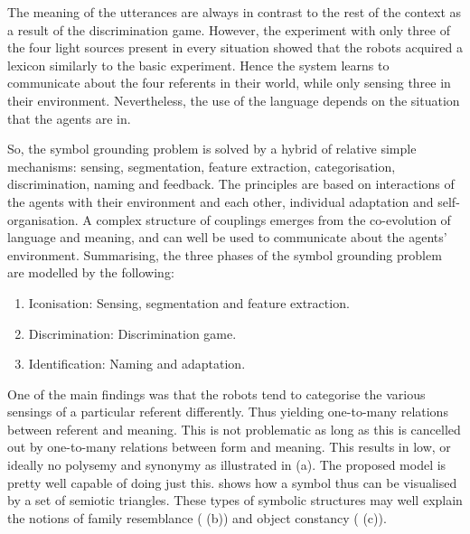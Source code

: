 The meaning of the utterances are always in contrast to the rest of the context as a result of the discrimination game. However, the experiment with only three of the four light sources present in every situation showed that the robots acquired a lexicon similarly to the basic experiment. Hence the system learns to communicate about the four referents in their world, while only sensing three in their environment. Nevertheless, the use of the language depends on the situation that the agents are in.

So, the symbol grounding problem is solved by a hybrid of relative simple mechanisms: sensing, segmentation, feature extraction, categorisation, discrimination, naming and feedback. The principles are based on interactions of the agents with their environment and each other, individual adaptation and self-organisation. A complex structure of couplings emerges from the co-evolution of language and meaning, and can well be used to communicate about the agents' environment. Summarising, the three phases of the symbol grounding problem are modelled by the following:

\begin{enumerate}
\item {\sc Iconisation:} Sensing, segmentation and feature extraction.
\item {\sc Discrimination:} Discrimination game.
\item {\sc Identification:} Naming and adaptation.
\end{enumerate}

One of the main findings was that the robots tend to categorise the various sensings of a particular referent differently. Thus yielding one-to-many relations between referent and meaning. This is not problematic as long as this is cancelled out by one-to-many relations between form and meaning. This results in low, or ideally no polysemy and synonymy as illustrated in  (a). The proposed model is pretty well capable of doing just this.  shows how a symbol thus can be visualised by a set of semiotic triangles. These types of symbolic structures may well explain the notions of family resemblance ( (b)) and object constancy ( (c)).

